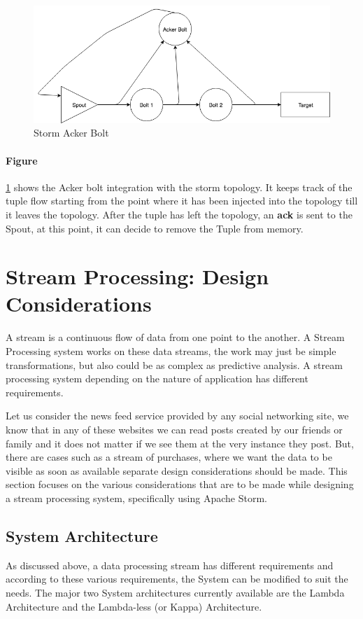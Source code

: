 \documentclass[runningheads,a4paper]{llncs}[2015/06/24]
\begin{document}
\begin{figure}
  \begin{center}
    \includegraphics[width=.7\textwidth]{acker.png}
    \caption{Storm Acker Bolt \cite{stormtwitter}}
    \label{fig:acker}
   \end{center}
\end{figure}

\paragraph{Figure} \ref{fig:acker} shows the Acker bolt integration with the storm topology. It keeps track of the tuple flow starting from the point where it has been injected into the topology till it leaves the topology. After the tuple has left the topology, an \textbf{ack} is sent to the Spout, at this point, it can decide to remove the Tuple from memory.

\section{Stream Processing: Design Considerations}
A stream is a continuous flow of data from one point to the another. A Stream Processing system works on these data streams, the work may just be simple transformations, but also could be as complex as predictive analysis. A stream processing system depending on the nature of application has different requirements.

Let us consider the news feed service provided by any social networking site, we know that in any of these websites we can read posts created by our friends or family and it does not matter if we see them at the very instance they post. But, there are cases such as a stream of purchases, where we want the data to be visible as soon as available separate design considerations should be made. This section focuses on the various considerations that are to be made while designing a stream processing system, specifically using Apache Storm.

\subsection{System Architecture}
As discussed above, a data processing stream has different requirements and according to these various requirements, the System can be modified to suit the needs. The major two System architectures currently available are the Lambda Architecture and the Lambda-less (or Kappa) Architecture.
\end{document}
